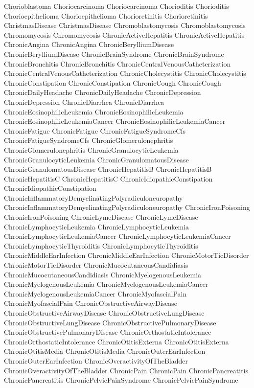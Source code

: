  Chorioblastoma
 Choriocarcinoma
 Choriocarcinoma
 Chorioditis
 Chorioditis
 Chorioepithelioma
 Chorioepithelioma
 Chorioretinitis
 Chorioretinitis
 ChristmasDisease
 ChristmasDisease
 Chromoblastomycosis
 Chromoblastomycosis
 Chromomycosis
 Chromomycosis
 ChronicActiveHepatitis
 ChronicActiveHepatitis
 ChronicAngina
 ChronicAngina
 ChronicBerylliumDisease
 ChronicBerylliumDisease
 ChronicBrainSyndrome
 ChronicBrainSyndrome
 ChronicBronchitis
 ChronicBronchitis
 ChronicCentralVenousCatheterization
 ChronicCentralVenousCatheterization
 ChronicCholecystitis
 ChronicCholecystitis
 ChronicConstipation
 ChronicConstipation
 ChronicCough
 ChronicCough
 ChronicDailyHeadache
 ChronicDailyHeadache
 ChronicDepression
 ChronicDepression
 ChronicDiarrhea
 ChronicDiarrhea
 ChronicEosinophilicLeukemia
 ChronicEosinophilicLeukemia
 ChronicEosinophilicLeukemiaCancer
 ChronicEosinophilicLeukemiaCancer
 ChronicFatigue
 ChronicFatigue
 ChronicFatigueSyndromeCfs
 ChronicFatigueSyndromeCfs
 ChronicGlomerulonephritis
 ChronicGlomerulonephritis
 ChronicGranulocyticLeukemia
 ChronicGranulocyticLeukemia
 ChronicGranulomatousDisease
 ChronicGranulomatousDisease
 ChronicHepatitisB
 ChronicHepatitisB
 ChronicHepatitisC
 ChronicHepatitisC
 ChronicIdiopathicConstipation
 ChronicIdiopathicConstipation
 ChronicInflammatoryDemyelinatingPolyradiculoneuropathy
 ChronicInflammatoryDemyelinatingPolyradiculoneuropathy
 ChronicIronPoisoning
 ChronicIronPoisoning
 ChronicLymeDisease
 ChronicLymeDisease
 ChronicLymphocyticLeukemia
 ChronicLymphocyticLeukemia
 ChronicLymphocyticLeukemiaCancer
 ChronicLymphocyticLeukemiaCancer
 ChronicLymphocyticThyroiditis
 ChronicLymphocyticThyroiditis
 ChronicMiddleEarInfection
 ChronicMiddleEarInfection
 ChronicMotorTicDisorder
 ChronicMotorTicDisorder
 ChronicMucocutaneousCandidiasis
 ChronicMucocutaneousCandidiasis
 ChronicMyelogenousLeukemia
 ChronicMyelogenousLeukemia
 ChronicMyelogenousLeukemiaCancer
 ChronicMyelogenousLeukemiaCancer
 ChronicMyofascialPain
 ChronicMyofascialPain
 ChronicObstructiveAirwayDisease
 ChronicObstructiveAirwayDisease
 ChronicObstructiveLungDisease
 ChronicObstructiveLungDisease
 ChronicObstructivePulmonaryDisease
 ChronicObstructivePulmonaryDisease
 ChronicOrthostaticIntolerance
 ChronicOrthostaticIntolerance
 ChronicOtitisExterna
 ChronicOtitisExterna
 ChronicOtitisMedia
 ChronicOtitisMedia
 ChronicOuterEarInfection
 ChronicOuterEarInfection
 ChronicOveractivityOfTheBladder
 ChronicOveractivityOfTheBladder
 ChronicPain
 ChronicPain
 ChronicPancreatitis
 ChronicPancreatitis
 ChronicPelvicPainSyndrome
 ChronicPelvicPainSyndrome
